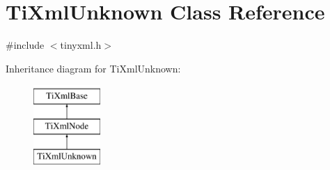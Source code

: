 \hypertarget{classTiXmlUnknown}{\section{Ti\-Xml\-Unknown Class Reference}
\label{classTiXmlUnknown}
}


{\ttfamily \#include $<$tinyxml.\-h$>$}

Inheritance diagram for Ti\-Xml\-Unknown\-:\begin{figure}[H]
\begin{center}
\leavevmode
\includegraphics[height=3.000000cm]{classTiXmlUnknown}
\end{center}
\end{figure}
